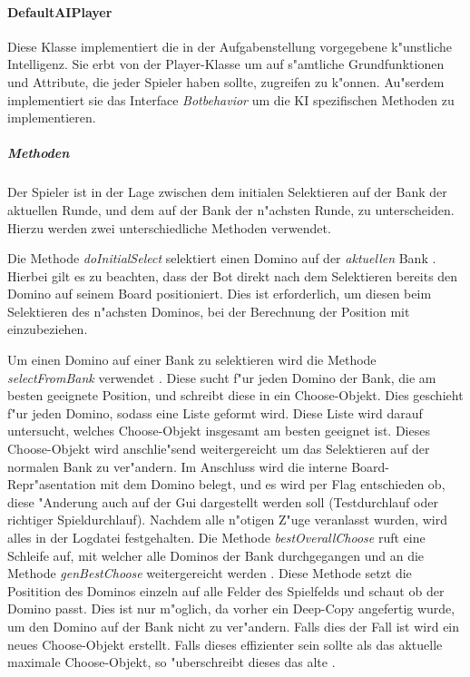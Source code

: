 \paragraph{DefaultAIPlayer}
\label{par:defaultAIPlayer}
Diese Klasse implementiert die in der Aufgabenstellung vorgegebene k"unstliche Intelligenz. Sie erbt von der Player-Klasse um auf s"amtliche Grundfunktionen und Attribute, die jeder Spieler haben sollte, zugreifen zu k"onnen. Au"serdem implementiert sie das Interface \emph{Botbehavior} um die KI spezifischen Methoden zu implementieren. 

\subparagraph{Methoden}
Der Spieler ist in der Lage zwischen dem initialen Selektieren auf der Bank der aktuellen Runde, und dem auf der Bank der n"achsten Runde, zu unterscheiden. Hierzu werden zwei unterschiedliche Methoden verwendet. 

Die Methode \emph{doInitialSelect} selektiert einen Domino auf der \emph{aktuellen} Bank . Hierbei gilt es zu beachten, dass der Bot direkt nach dem Selektieren bereits den Domino auf seinem Board positioniert. Dies ist erforderlich, um diesen beim Selektieren des n"achsten Dominos, bei der Berechnung der Position mit einzubeziehen. 

Um einen Domino auf einer Bank zu selektieren wird die Methode \emph{selectFromBank} verwendet . Diese sucht f"ur jeden Domino der Bank, die am besten geeignete Position, und schreibt diese in ein Choose-Objekt. Dies geschieht f"ur jeden Domino, sodass eine Liste geformt wird. Diese Liste wird darauf untersucht, welches Choose-Objekt insgesamt am besten geeignet ist. Dieses Choose-Objekt wird anschlie"send weitergereicht um das Selektieren auf der normalen Bank zu ver"andern. Im Anschluss wird die interne Board-Repr"asentation mit dem Domino belegt, und es wird per Flag entschieden ob, diese "Anderung auch auf der Gui dargestellt werden soll (Testdurchlauf oder richtiger Spieldurchlauf). Nachdem alle n"otigen Z"uge veranlasst wurden, wird alles in der Logdatei festgehalten. Die Methode \emph{bestOverallChoose} ruft eine Schleife auf, mit welcher alle Dominos der Bank durchgegangen und an die Methode \emph{genBestChoose} weitergereicht werden . Diese Methode setzt die Positition des Dominos einzeln auf alle Felder des Spielfelds und schaut ob der Domino passt. Dies ist nur m"oglich, da vorher ein Deep-Copy angefertig wurde, um den Domino auf der Bank nicht zu ver"andern. Falls dies der Fall ist wird ein neues Choose-Objekt erstellt. Falls dieses effizienter sein sollte als das aktuelle maximale Choose-Objekt, so "uberschreibt dieses das alte . 

